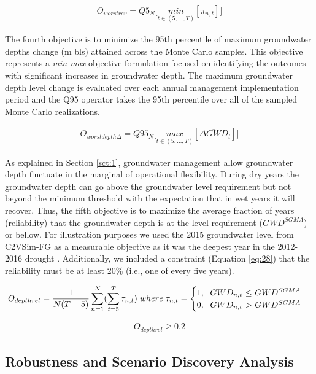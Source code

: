 \documentclass[a4paper,fleqn]{cas-sc}
\begin{document}
\begin{align}
O_{worstrev} = Q5_{N} \bigg[\underset{t\in(5,...,T)}{min}[\pi_{n,t}]\bigg]
\end{align}

The fourth objective is to minimize the 95th percentile of maximum groundwater depths change (m bls) attained across the Monte Carlo samples. This objective represents a \textit{min-max} objective formulation focused on identifying the outcomes with significant increases in groundwater depth. The maximum groundwater depth level change is evaluated over each annual management implementation period and the Q95 operator takes the 95th percentile over all of the sampled Monte Carlo  realizations. 

\begin{align}
O_{worstdepth\Delta} = Q95_{N} \bigg[\underset{t\in(5,...,T)}{max}[\overline{\Delta GWD}_{t}]\bigg]
\end{align}

As explained in Section \ref{sct:1}, groundwater management allow groundwater depth fluctuate in the marginal of operational flexibility. During dry years the groundwater depth can go above the groundwater level requirement but not beyond the minimum threshold with the expectation that in wet years it will recover. Thus, the fifth objective is to maximize the average fraction of years (reliability) that the groundwater depth is at the level requirement ($GWD^{SGMA}$) or bellow. For illustration purposes we used the 2015 groundwater level from C2VSim-FG as a measurable objective as it was the deepest year in the  2012-2016 drought \citep{lund_lessons_2018}. Additionally, we included a constraint (Equation \ref{eq:28}) that the reliability must be at least 20\% (i.e., one of every five years). 

\begin{align}
O_{depthrel} = \frac{1}{N(T-5)}\sum_{n=1}^N(\sum_{t=5}^T \tau_{n,t})\; where\; \tau_{n,t} = \begin{cases}
      1, \text{\; $GWD_{n,t}$  $\leq$ $GWD^{SGMA}$}\\
      0, \text{\; $GWD_{n,t}$ $>$ $GWD^{SGMA}$}\\
\end{cases}      
\end{align}


\begin{align}\label{eq:28}
O_{depthrel} \geq 0.2
\end{align}

\subsection{Robustness and Scenario Discovery Analysis}\label{sct:3.3}
\end{document}
